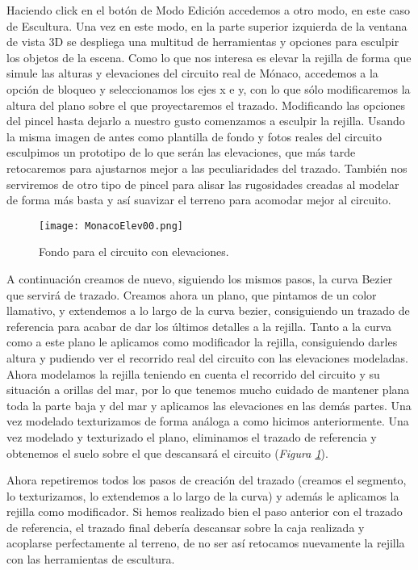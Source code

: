 Haciendo click en el botón de Modo Edición accedemos a otro modo, en este caso de Escultura. Una vez en este modo, en la parte superior izquierda de la ventana de vista 3D se despliega una multitud de herramientas y opciones para esculpir los objetos de la escena. Como lo que nos interesa es elevar la rejilla de forma que simule las alturas y elevaciones del circuito real de Mónaco, accedemos a la opción de bloqueo y seleccionamos los ejes x e y, con lo que sólo modificaremos la altura del plano sobre el que proyectaremos el trazado. Modificando las opciones del pincel hasta dejarlo a nuestro gusto comenzamos a esculpir la rejilla. Usando la misma imagen de antes como plantilla de fondo y fotos reales del circuito esculpimos un prototipo de lo que serán las elevaciones, que más tarde retocaremos para ajustarnos mejor a las peculiaridades del trazado. También nos serviremos de otro tipo de pincel para alisar las rugosidades creadas al modelar de forma más basta y así suavizar el terreno para acomodar mejor al circuito.

\begin{figure}[t]
	\centering
	\texttt{[image: MonacoElev00.png]}
	\caption{Fondo para el circuito con elevaciones.} \label{fig:monacoelev00}
\end{figure}

A continuación creamos de nuevo, siguiendo los mismos pasos, la curva Bezier que servirá de trazado. Creamos ahora un plano, que pintamos de un color llamativo, y extendemos a lo largo de la curva bezier, consiguiendo un trazado de referencia para acabar de dar los últimos detalles a la rejilla. Tanto a la curva como a este plano le aplicamos como modificador la rejilla, consiguiendo darles altura y pudiendo ver el recorrido real del circuito con las elevaciones modeladas. Ahora modelamos la rejilla teniendo en cuenta el recorrido del circuito y su situación a orillas del mar, por lo que tenemos mucho cuidado de mantener plana toda la parte baja y del mar y aplicamos las elevaciones en las demás partes. Una vez modelado texturizamos de forma análoga a como hicimos anteriormente. Una vez modelado y texturizado el plano, eliminamos el trazado de referencia y obtenemos el suelo sobre el que descansará el circuito (\textit{Figura \ref{fig:monacoelev00}}).

Ahora repetiremos todos los pasos de creación del trazado (creamos el segmento, lo texturizamos, lo extendemos a lo largo de la curva) y además le aplicamos la rejilla como modificador. Si hemos realizado bien el paso anterior con el trazado de referencia, el trazado final debería descansar sobre la caja realizada y acoplarse perfectamente al terreno, de no ser así retocamos nuevamente la rejilla con las herramientas de escultura. 

